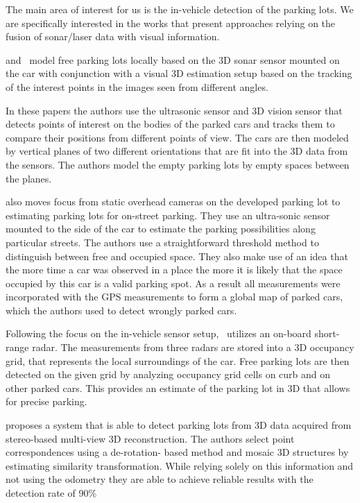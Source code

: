 The main area of interest for us is the in-vehicle detection of the parking
lots. We are specifically interested in the works that present approaches
relying on the fusion of sonar/laser data with visual information.

\citet{fintyelvestri} and~\citet{abadvestri} model free parking lots locally
based on the 3D sonar sensor mounted on the car with conjunction with a visual
3D estimation setup based on the tracking of the interest points in the images
seen from different angles.

In these papers the authors use the ultrasonic sensor and 3D vision sensor
that detects points of interest on the bodies of the parked cars and tracks
them to compare their positions from different points of view. The cars are
then modeled by vertical planes of two different orientations that are fit
into the 3D data from the sensors. The authors model the empty parking lots by
empty spaces between the planes.

\citet{vladimircoric} also moves focus from static overhead cameras on the
developed parking lot to estimating parking lots for on-street parking. They
 use an ultra-sonic sensor mounted to the side of the car to
estimate the parking possibilities along particular streets. The authors use a
straightforward threshold method to distinguish between free and occupied
space. They also make use of an idea that the more time a car was observed in
a place the more it is likely that the space occupied by this car is a valid
parking spot. As a result all measurements were incorporated with the GPS
measurements to form a global map of parked cars, which the authors used to
detect wrongly parked cars.

Following the focus on the in-vehicle sensor setup,~\citet{schmid11} utilizes
an on-board short-range radar. The measurements from three radars are stored
into a 3D occupancy grid, that represents the local surroundings of the car.
Free parking lots are then detected on the given grid by analyzing occupancy
grid cells on curb and on other parked cars. This provides an estimate of the
parking lot in 3D that allows for precise parking.

\citet{suhr10} proposes a system that is able to detect parking lots from 3D
data acquired from stereo-based multi-view 3D reconstruction. The authors
select point correspondences using a de-rotation- based method and mosaic 3D
structures by estimating similarity transformation. While relying solely on
this information and not using the odometry they are able to achieve reliable
results with the detection rate of 90\%

